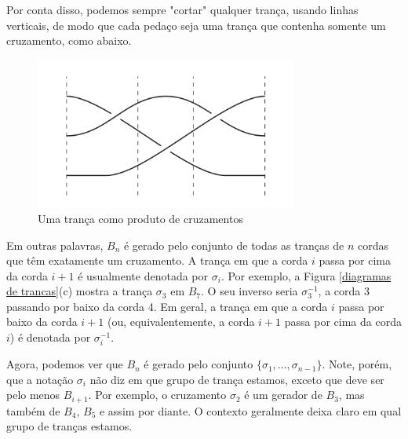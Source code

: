 \documentclass[a4paper,portuguese,11pt,twoside, leqno]{book}
\theoremstyle{definition}
\begin{document}
	\par\vspace{0.3cm} Por conta disso, podemos sempre "cortar" qualquer trança, usando linhas verticais, de modo que cada pedaço seja uma trança que contenha somente um cruzamento, como abaixo.
	
	\begin{figure}[H]
		\captionsetup{justification=centering}
		\begin{center}
			\includegraphics[width=8.6cm]{fig_18_8.png}
		\end{center}\caption{Uma trança como produto de cruzamentos}\label{cortar trancas}
	\end{figure} 
	
	\par\vspace{0.3cm} Em outras palavras, $B_n$ é gerado pelo conjunto de todas as tranças de $n$ cordas que têm exatamente um cruzamento. A trança em que a corda $i$ passa por cima da corda $i+1$ é usualmente denotada por $\sigma_i$. Por exemplo, a Figura \eqref{diagramas de trancas}(c) mostra a trança $\sigma_3$ em $B_7$. O seu inverso seria $\sigma_3^{-1}$, a corda 3 passando por baixo da corda 4. Em geral, a trança em que a corda $i$ passa por baixo da corda $i+1$ (ou, equivalentemente, a corda $i+1$ passa por cima da corda $i$) é denotada por $\sigma_i^{-1}$. 
	
	\par\vspace{0.3cm} Agora, podemos ver que $B_n$ é gerado pelo conjunto $ \{ \sigma_1, \dots, \sigma_{n-1} \} $. Note, porém, que a notação $\sigma_i$ não diz em que grupo de trança estamos, exceto que deve ser pelo menos $B_{i+1}$. Por exemplo, o cruzamento $\sigma_2$ é um gerador de $B_3$, mas também de $B_4$, $B_5$ e assim por diante. O contexto geralmente deixa claro em qual grupo de tranças estamos. 
	
\end{document}
